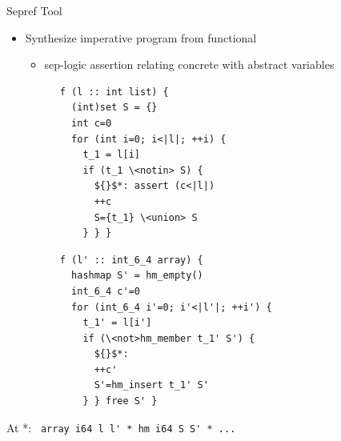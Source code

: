 \documentclass[fleqn]{beamer}
\newcommand{\isai}{\lstinline[language=isabelle,basicstyle=\normalsize\ttfamily\slshape]}
\begin{document}
\begin{frame}[fragile]{Sepref Tool}
  \begin{itemize}
   \item<+-> Synthesize imperative program from functional
    \begin{itemize}
     \item sep-logic assertion relating concrete with abstract variables

    \end{itemize}
    \begin{minipage}{.48\textwidth}
    \onslide<+->
    \begin{lstlisting}
      f (l :: int list) {
        (int)set S = {}
        int c=0
        for (int i=0; i<|l|; ++i) {
          t_1 = l[i]
          if (t_1 \<notin> S) {
            ${}$*: assert (c<|l|)
            ++c
            S={t_1} \<union> S
          } } }
    \end{lstlisting}
    \end{minipage}%
    \begin{minipage}{.48\textwidth}
    \onslide<+->
    \begin{lstlisting}
      f (l' :: int_6_4 array) {
        hashmap S' = hm_empty()
        int_6_4 c'=0
        for (int_6_4 i'=0; i'<|l'|; ++i') {
          t_1' = l[i']
          if (\<not>hm_member t_1' S') {
            ${}$*:
            ++c'
            S'=hm_insert t_1' S'
          } } free S' }
    \end{lstlisting}
    \end{minipage}
  \end{itemize}
  \onslide<+->At *: \isai{ array i64 l l' * hm i64 S S' * ... }

\end{frame}
\end{document}
